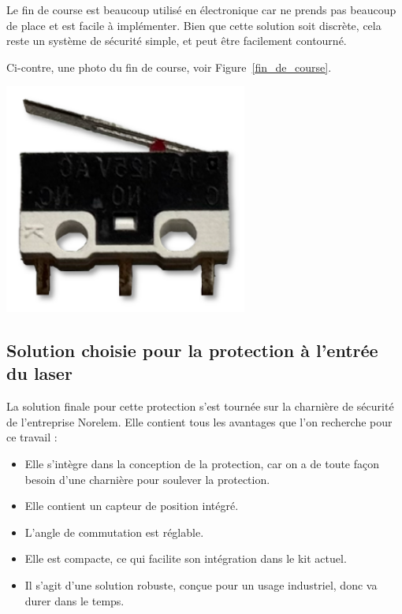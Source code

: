 \begin{minipage}[c]{0.6\textwidth}
    Le fin de course est beaucoup utilisé en électronique car ne prends pas beaucoup de place et est facile à implémenter. Bien que cette solution soit discrète, cela reste un système de sécurité simple, et peut être facilement contourné.

    Ci-contre, une photo du fin de course, voir Figure~\ref{fin_de_course}.
\end{minipage}\hfill
\begin{minipage}[c]{0.35\textwidth}
    \begin{center}
        \includegraphics[width=0.6\textwidth]{assets/figures/Protections_laser/Securite_electrique/fin_de_course.png}
    \end{center}
    \label{fin_de_course}
\end{minipage}

\newpage
\subsection{Solution choisie pour la protection à l'entrée du laser}
La solution finale pour cette protection s'est tournée sur la charnière de sécurité de l'entreprise Norelem. Elle contient tous les avantages que l'on recherche pour ce travail :
\begin{itemize}
    \item Elle s'intègre dans la conception de la protection, car on a de toute façon besoin d'une charnière pour soulever la protection.
    \item Elle contient un capteur de position intégré.
    \item L'angle de commutation est réglable.
    \item Elle est compacte, ce qui facilite son intégration dans le kit actuel.
    \item Il s'agit d'une solution robuste, conçue pour un usage industriel, donc va durer dans le temps.
\end{itemize}

